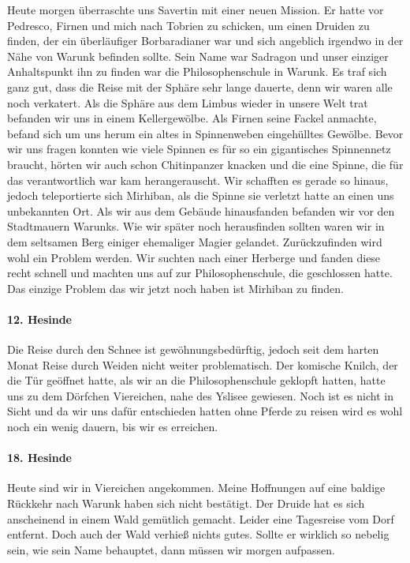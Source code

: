 Heute morgen überraschte uns Savertin mit einer neuen Mission. Er hatte vor Pedresco, Firnen und mich nach Tobrien zu schicken, um einen Druiden zu finden, der ein überläufiger Borbaradianer war und sich angeblich irgendwo in der Nähe von Warunk befinden sollte. Sein Name war Sadragon und unser einziger Anhaltspunkt ihn zu finden war die Philosophenschule in Warunk. Es traf sich ganz gut, dass die Reise mit der Sphäre sehr lange dauerte, denn wir waren alle noch verkatert. Als die Sphäre aus dem Limbus wieder in unsere Welt trat befanden wir uns in einem Kellergewölbe. Als Firnen seine Fackel anmachte, befand sich um uns herum ein altes in Spinnenweben eingehülltes Gewölbe. Bevor wir uns fragen konnten wie viele Spinnen es für so ein gigantisches Spinnennetz braucht, hörten wir auch schon Chitinpanzer knacken und die eine Spinne, die für das verantwortlich war kam herangerauscht. Wir schafften es gerade so hinaus, jedoch teleportierte sich Mirhiban, als die Spinne sie verletzt hatte an einen uns unbekannten Ort. Als wir aus dem Gebäude hinausfanden befanden wir vor den Stadtmauern Warunks. Wie wir später noch herausfinden sollten waren wir in dem seltsamen Berg einiger ehemaliger Magier gelandet. Zurückzufinden wird wohl ein Problem werden. Wir suchten nach einer Herberge und fanden diese recht schnell und machten uns auf zur Philosophenschule, die geschlossen hatte. Das einzige Problem das wir jetzt noch haben ist Mirhiban zu finden.

\paragraph{12. Hesinde}
Die Reise durch den Schnee ist gewöhnungsbedürftig, jedoch seit dem harten Monat Reise durch Weiden nicht weiter problematisch. Der komische Knilch, der die Tür geöffnet hatte, als wir an die Philosophenschule geklopft hatten, hatte uns zu dem Dörfchen Viereichen, nahe des Yslisee gewiesen. Noch ist es nicht in Sicht und da wir uns dafür entschieden hatten ohne Pferde zu reisen wird es wohl noch ein wenig dauern, bis wir es erreichen.

\paragraph{18. Hesinde}
Heute sind wir in Viereichen angekommen. Meine Hoffnungen auf eine baldige Rückkehr nach Warunk haben sich nicht bestätigt. Der Druide hat es sich anscheinend in einem Wald gemütlich gemacht. Leider eine Tagesreise vom Dorf entfernt. Doch auch der Wald verhieß nichts gutes. Sollte er wirklich so nebelig sein, wie sein Name behauptet, dann müssen wir morgen aufpassen.

